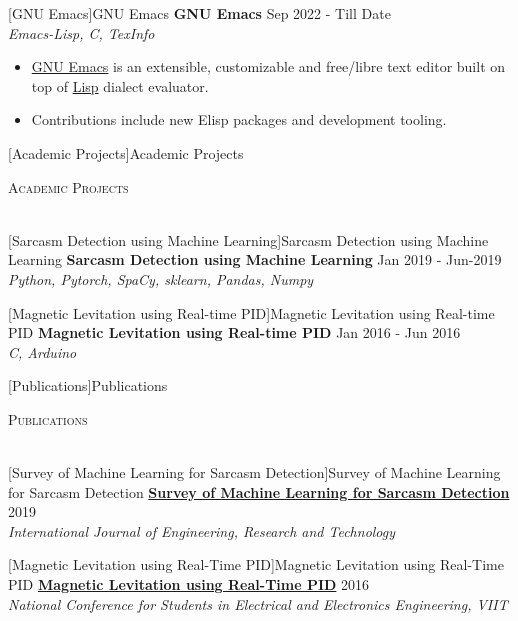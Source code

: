 \documentclass[a4paper]{article}
\newcommand{\lineunder} {
    \vspace*{-8pt} \\
    \hspace*{-18pt} \hrulefill \\
}
\newcommand{\header} [1] {
    {\hspace*{-18pt}\vspace*{6pt} \textsc{#1}}
    \vspace*{-6pt} \lineunder
}
\begin{document}
[GNU Emacs]{GNU Emacs}
{\textbf{GNU Emacs}} \hfill Sep 2022 - Till Date \\
\textit{Emacs-Lisp, C, TexInfo} \\
\begin{itemize}
  \item \href{https://www.gnu.org/software/emacs/}{GNU Emacs} is an extensible, customizable and free/libre text editor built on top of \href{https://en.wikipedia.org/wiki/Lisp_(programming_language)}{Lisp} dialect evaluator. \\
  \item Contributions include new Elisp packages and development tooling.\\
\end{itemize}

[Academic Projects]{Academic Projects}
\header{Academic Projects}
\vspace{1mm}

[Sarcasm Detection using Machine Learning]{Sarcasm Detection using Machine Learning}
{\textbf{Sarcasm Detection using Machine Learning}} \hfill Jan 2019 - Jun-2019\\
\textit{Python, Pytorch, SpaCy, sklearn, Pandas, Numpy} \\
\vspace{1mm}

[Magnetic Levitation using Real-time PID]{Magnetic Levitation using Real-time PID}
{\textbf{Magnetic Levitation using Real-time PID}} \hfill Jan 2016 - Jun 2016\\
\textit{C, Arduino} \\
\vspace*{2mm}

[Publications]{Publications}
\header{Publications}
\vspace{1mm}

[Survey of Machine Learning for Sarcasm Detection]{Survey of Machine Learning for Sarcasm Detection}
{\textbf{\href{https://www.ijert.org/survey-of-machine-learning-for-sarcasm-detection}{Survey of Machine Learning for Sarcasm Detection}}} \hfill 2019\\
\textit{International Journal of Engineering, Research and Technology} \\
\vspace*{2mm}

[Magnetic Levitation using Real-Time PID]{Magnetic Levitation using Real-Time PID}
{\textbf{\href{https://ijrat.org/downloads/Conference_Proceedings/ncseee2016/ncseee-15.pdf}{Magnetic Levitation using Real-Time PID}}} \hfill 2016\\
\textit{National Conference for Students in Electrical and Electronics Engineering, VIIT} \\
\vspace*{2mm}
\end{document}
